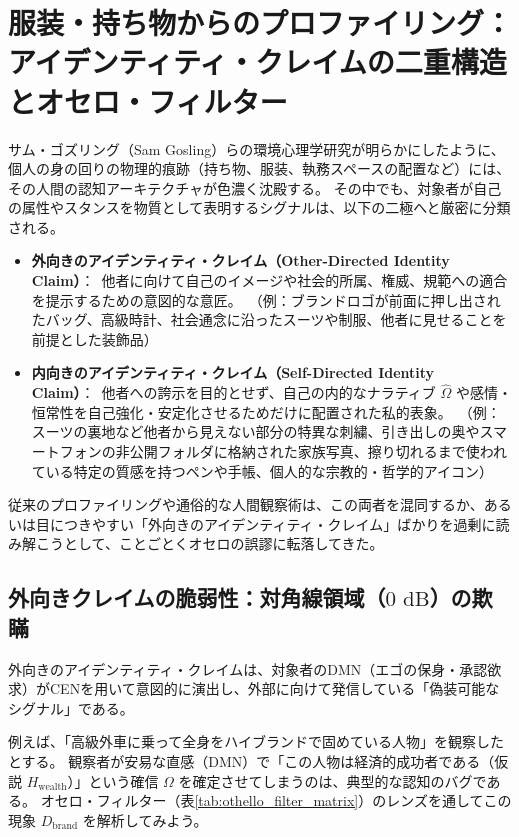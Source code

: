 \section{服装・持ち物からのプロファイリング：アイデンティティ・クレイムの二重構造とオセロ・フィルター}

サム・ゴズリング（Sam Gosling）らの環境心理学研究が明らかにしたように、個人の身の回りの物理的痕跡（持ち物、服装、執務スペースの配置など）には、その人間の認知アーキテクチャが色濃く沈殿する。
その中でも、対象者が自己の属性やスタンスを物質として表明するシグナルは、以下の二極へと厳密に分類される。

\begin{itemize}
\item \textbf{外向きのアイデンティティ・クレイム（Other-Directed Identity Claim）}：\
他者に向けて自己のイメージや社会的所属、権威、規範への適合を提示するための意図的な意匠。\
（例：ブランドロゴが前面に押し出されたバッグ、高級時計、社会通念に沿ったスーツや制服、他者に見せることを前提とした装飾品）
\item \textbf{内向きのアイデンティティ・クレイム（Self-Directed Identity Claim）}：\
他者への誇示を目的とせず、自己の内的なナラティブ $\hat{\Omega}$ や感情・恒常性を自己強化・安定化させるためだけに配置された私的表象。\
（例：スーツの裏地など他者から見えない部分の特異な刺繍、引き出しの奥やスマートフォンの非公開フォルダに格納された家族写真、擦り切れるまで使われている特定の質感を持つペンや手帳、個人的な宗教的・哲学的アイコン）
\end{itemize}

従来のプロファイリングや通俗的な人間観察術は、この両者を混同するか、あるいは目につきやすい「外向きのアイデンティティ・クレイム」ばかりを過剰に読み解こうとして、ことごとくオセロの誤謬に転落してきた。

\subsection{外向きクレイムの脆弱性：対角線領域（$0\text{ dB}$）の欺瞞}
外向きのアイデンティティ・クレイムは、対象者のDMN（エゴの保身・承認欲求）がCENを用いて意図的に演出し、外部に向けて発信している「偽装可能なシグナル」である。

例えば、「高級外車に乗って全身をハイブランドで固めている人物」を観察したとする。
観察者が安易な直感（DMN）で「この人物は経済的成功者である（仮説 $H_{\mathrm{wealth}}$）」という確信 $\Omega$ を確定させてしまうのは、典型的な認知のバグである。
オセロ・フィルター（表\ref{tab:othello_filter_matrix}）のレンズを通してこの現象 $D_{\mathrm{brand}}$ を解析してみよう。

